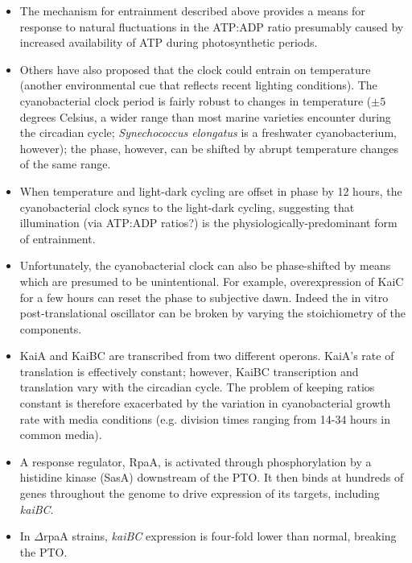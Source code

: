 \documentclass{article}
\begin{document}
\begin{itemize}
\item The mechanism for entrainment described above provides a means for response to natural fluctuations in the ATP:ADP ratio presumably caused by increased availability of ATP during photosynthetic periods.
\item Others have also proposed that the clock could entrain on temperature (another environmental cue that reflects recent lighting conditions). The cyanobacterial clock period is fairly robust to changes in temperature ($\pm 5$ degrees Celsius, a wider range than most marine varieties encounter during the circadian cycle; \textit{Synechococcus elongatus} is a freshwater cyanobacterium, however); the phase, however, can be shifted by abrupt temperature changes of the same range.
\item When temperature and light-dark cycling are offset in phase by 12 hours, the cyanobacterial clock syncs to the light-dark cycling, suggesting that illumination (via ATP:ADP ratios?) is the physiologically-predominant form of entrainment.
\item Unfortunately, the cyanobacterial clock can also be phase-shifted by means which are presumed to be unintentional. For example, overexpression of KaiC for a few hours can reset the phase to subjective dawn. Indeed the in vitro post-translational oscillator can be broken by varying the stoichiometry of the components.
\item KaiA and KaiBC are transcribed from two different operons. KaiA's rate of translation is effectively constant; however, KaiBC transcription and translation vary with the circadian cycle. The problem of keeping ratios constant is therefore exacerbated by the variation in cyanobacterial growth rate with media conditions (e.g. division times ranging from 14-34 hours in common media).
\item A response regulator, RpaA, is activated through phosphorylation by a histidine kinase (SasA) downstream of the PTO. It then binds at hundreds of genes throughout the genome to drive expression of its targets, including \textit{kaiBC}.
\item In $\Delta$rpaA strains, \textit{kaiBC} expression is four-fold lower than normal, breaking the PTO.
\end{itemize}
\end{document}

